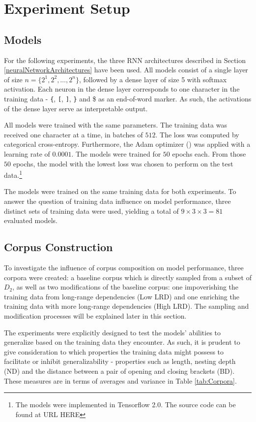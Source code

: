 \section{Experiment Setup}\label{experimentSetup}

\subsection{Models}\label{models}
For the following experiments, the three RNN architectures described in Section \ref{neuralNetworkArchitectures} have been used. All models consist of a single layer of size $n = \lbrace 2^{1}, 2^{2}, \dots, 2^{n} \rbrace$, followed by a dense layer of size 5 with softmax activation. Each neuron in the dense layer corresponds to one character in the training data - \texttt{\{}, \texttt{[}, \texttt{]}, \texttt{\}} and \$ as an end-of-word marker. As such, the activations of the dense layer serve as interpretable output.

All models were trained with the same parameters. The training data was received one character at a time, in batches of $512$. The loss was computed by categorical cross-entropy. Furthermore, the Adam optimizer (\cite{Kingma2014}) was applied with a learning rate of $0.0001$. The models were trained for $50$ epochs each. From those $50$ epochs, the model with the lowest loss was chosen to perform on the test data.\footnote{The models were implemented in Tensorflow 2.0. The source code can be found at URL HERE} %

The models were trained on the same training data for both experiments. To answer the question of training data influence on model performance, three distinct sets of training data were used, yielding a total of $9 \times 3 \times 3 = 81$ evaluated models.

\subsection{Corpus Construction}\label{corpusConstruction}
To investigate the influence of corpus composition on model performance, three corpora were created: a baseline corpus which is directly sampled from a subset of $D_{2}$, as well as two modifications of the baseline corpus: one impoverishing the training data from long-range dependencies (Low LRD) and one enriching the training data with more long-range dependencies (High LRD). The sampling and modification processes will be explained later in this section.

The experiments were explicitly designed to test the models' abilities to generalize based on the training data they encounter. As such, it is prudent to give consideration to which properties the training data might possess to facilitate or inhibit generalizability - properties such as length, nesting depth (ND) and the distance between a pair of opening and closing brackets (BD). These measures are in terms of averages and variance in Table \ref{tab:Corpora}.

